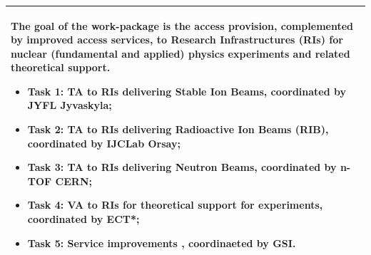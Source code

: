 \begin{table}[H]
\begin{tabular}{|p{}|}
        \hline
        \rowcolor{white} 
        \hspace*{-0.75cm} 
        \begin{minipage}[t]{\textwidth}
        {\leftskip=15pt
        The goal of the work-package is the access provision, complemented by improved access services, to Research Infrastructures (RIs) for nuclear (fundamental and applied) physics experiments and related theoretical support.
    		\begin{itemize}
    		    \item Task 1: TA to RIs delivering Stable Ion Beams, coordinated by JYFL Jyvaskyla;
    			\item Task 2: TA to RIs delivering Radioactive Ion Beams (RIB), coordinated by IJCLab Orsay;
			    \item Task 3: TA to RIs delivering Neutron Beams, coordinated by n-TOF CERN;
                    \item Task 4: VA to RIs for theoretical support for experiments, coordinated by ECT*; 
                    \item Task 5: Service improvements , coordinaeted by GSI.
    		\end{itemize} 
    		\vspace*{0.10em}
            }
		\end{minipage}        
        \\
        \hline
    \end{tabular}
    \vspace{0.5em}\vfill
\end{table}


